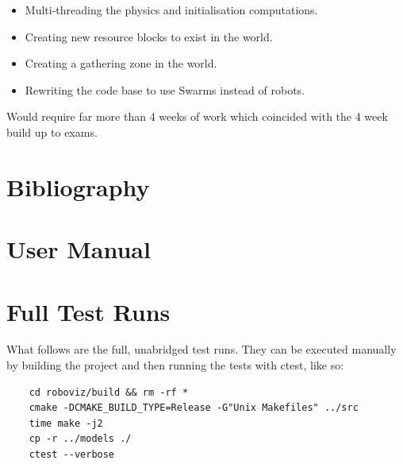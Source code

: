 \documentclass[11pt,a4paper]{article}
\begin{document}
\begin{itemize}
    \item Multi-threading the physics and initialisation computations.
    \item Creating new resource blocks to exist in the world.
    \item Creating a gathering zone in the world.
    \item Rewriting the code base to use Swarms instead of robots.
\end{itemize}

Would require far more than 4 weeks of work which coincided with the 4 week
build up to exams.

\section{Bibliography}
\printbibliography

\appendix
\section{User Manual}
\label{s:user-manual}


\section{Full Test Runs}
What follows are the full, unabridged test runs. They can be executed manually
by building the project and then running the tests with ctest, like so:

\begin{verbatim}
    cd roboviz/build && rm -rf *
    cmake -DCMAKE_BUILD_TYPE=Release -G"Unix Makefiles" ../src
    time make -j2
    cp -r ../models ./
    ctest --verbose
\end{verbatim}


\label{s:full-test-runs}

\end{document}
